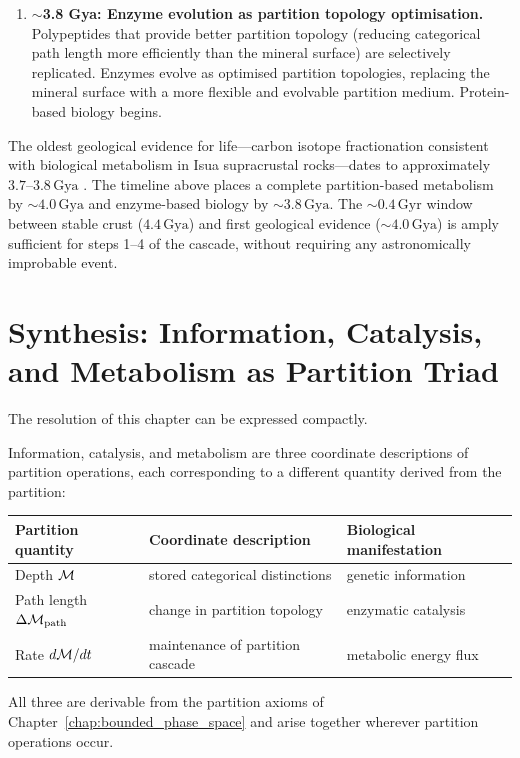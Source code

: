 \begin{enumerate}[label=\textbf{\arabic*.}]
  \item \textbf{$\sim$3.8 Gya: Enzyme evolution as partition topology optimisation.}
        Polypeptides that provide better partition topology (reducing categorical
        path length more efficiently than the mineral surface) are selectively
        replicated. Enzymes evolve as optimised partition topologies, replacing
        the mineral surface with a more flexible and evolvable partition medium.
        Protein-based biology begins.
\end{enumerate}

\begin{remark}
The oldest geological evidence for life---carbon isotope fractionation consistent
with biological metabolism in Isua supracrustal rocks---dates to approximately
$3.7$--$3.8\,\mathrm{Gya}$ \citep{ohtomo2014}. The timeline above places
a complete partition-based metabolism by $\sim 4.0\,\mathrm{Gya}$ and
enzyme-based biology by $\sim 3.8\,\mathrm{Gya}$. The $\sim 0.4\,\mathrm{Gyr}$
window between stable crust ($4.4\,\mathrm{Gya}$) and first geological evidence
($\sim 4.0\,\mathrm{Gya}$) is amply sufficient for steps 1--4 of the cascade,
without requiring any astronomically improbable event.
\end{remark}

\section{Synthesis: Information, Catalysis, and Metabolism as Partition Triad}
\label{sec:partition_triad}

The resolution of this chapter can be expressed compactly.

\begin{proposition}
\label{prop:partition_triad}
Information, catalysis, and metabolism are three coordinate descriptions of
partition operations, each corresponding to a different quantity derived from
the partition:

\begin{center}
\begin{tabular}{lll}
\toprule
\textbf{Partition quantity} & \textbf{Coordinate description} & \textbf{Biological manifestation} \\
\midrule
Depth $\mathcal{M}$ & stored categorical distinctions & genetic information \\
Path length $\Delta\mathcal{M}_{\mathrm{path}}$ & change in partition topology & enzymatic catalysis \\
Rate $d\mathcal{M}/dt$ & maintenance of partition cascade & metabolic energy flux \\
\bottomrule
\end{tabular}
\end{center}
All three are derivable from the partition axioms of
Chapter~\ref{chap:bounded_phase_space} and arise together wherever partition
operations occur.
\end{proposition}

